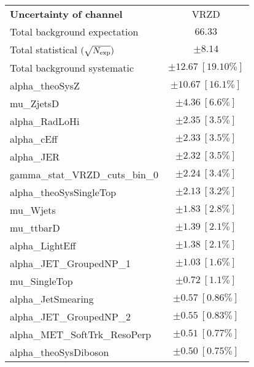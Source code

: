 
\begin{table}
\begin{center}
\setlength{\tabcolsep}{0.0pc}
\begin{tabular*}{\textwidth}{@{\extracolsep{\fill}}lc}
\noalign{\smallskip}\hline\noalign{\smallskip}
{\bf Uncertainty of channel}                                    & VRZD            \\
\noalign{\smallskip}\hline\noalign{\smallskip}
Total background expectation             &  $66.33$       \\
\noalign{\smallskip}\hline\noalign{\smallskip}
Total statistical $(\sqrt{N_{\rm exp}})$              & $\pm 8.14$       \\
Total background systematic               & $\pm 12.67\ [19.10\%] $             \\
\noalign{\smallskip}\hline\noalign{\smallskip}
\noalign{\smallskip}\hline\noalign{\smallskip}
alpha\_theoSysZ         & $\pm 10.67\ [16.1\%] $       \\
mu\_ZjetsD         & $\pm 4.36\ [6.6\%] $       \\
alpha\_RadLoHi         & $\pm 2.35\ [3.5\%] $       \\
alpha\_cEff         & $\pm 2.33\ [3.5\%] $       \\
alpha\_JER         & $\pm 2.32\ [3.5\%] $       \\
gamma\_stat\_VRZD\_cuts\_bin\_0         & $\pm 2.24\ [3.4\%] $       \\
alpha\_theoSysSingleTop         & $\pm 2.13\ [3.2\%] $       \\
mu\_Wjets         & $\pm 1.83\ [2.8\%] $       \\
mu\_ttbarD         & $\pm 1.39\ [2.1\%] $       \\
alpha\_LightEff         & $\pm 1.38\ [2.1\%] $       \\
alpha\_JET\_GroupedNP\_1         & $\pm 1.03\ [1.6\%] $       \\
mu\_SingleTop         & $\pm 0.72\ [1.1\%] $       \\
alpha\_JetSmearing         & $\pm 0.57\ [0.86\%] $       \\
alpha\_JET\_GroupedNP\_2         & $\pm 0.55\ [0.83\%] $       \\
alpha\_MET\_SoftTrk\_ResoPerp         & $\pm 0.51\ [0.77\%] $       \\
alpha\_theoSysDiboson         & $\pm 0.50\ [0.75\%] $       \\

\end{tabular*}
\end{center}
\end{table}
